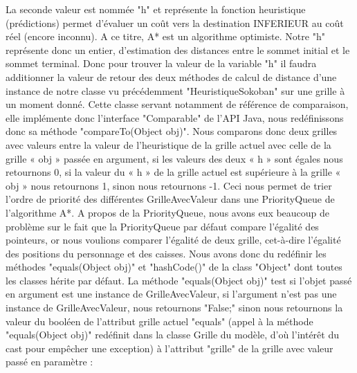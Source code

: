 \documentclass[a4paper,12pt]{article} %
\begin{document}
\newline\newline
La seconde valeur est nommée "h" et représente la fonction heuristique (prédictions) permet d’évaluer un coût vers la destination INFERIEUR au coût réel (encore inconnu).
\newline
A ce titre, A* est un algorithme optimiste.
\newline
Notre "h" représente donc un entier,  d’estimation des distances entre le sommet initial et le sommet terminal.
\newline
Donc pour trouver la valeur de la variable "h" il faudra additionner la valeur de retour des deux méthodes de calcul de distance d’une instance de notre classe vu précédemment "HeuristiqueSokoban" sur une grille à un moment donné. 
\newline\newline
Cette classe servant notamment de référence de comparaison, elle implémente donc l’interface "Comparable" de l’API Java, nous redéfinissons donc sa méthode "compareTo(Object obj)". 
\newline\newline
Nous comparons donc deux grilles avec valeurs entre la valeur de l’heuristique de la grille actuel avec celle de la grille « obj » passée en argument, si les valeurs des deux « h » sont égales nous retournons 0, si la valeur du « h » de la grille actuel est supérieure à la grille « obj » nous retournons 1, sinon nous retournons -1.
\newline\newline
Ceci nous permet de trier l’ordre de priorité des différentes GrilleAvecValeur dans une PriorityQueue de l’algorithme A*.
\newline\newline
A propos de la PriorityQueue, nous avons eux beaucoup de problème sur le fait que la PriorityQueue par défaut compare l’égalité des pointeurs, or nous voulions comparer l’égalité de deux grille, cet-à-dire l’égalité des positions du personnage et des caisses.
\newline\newline
Nous avons donc du redéfinir les méthodes "equals(Object obj)" et "hashCode()" de la class "Object" dont toutes les classes hérite par défaut.
\newline\newline 
La méthode "equals(Object obj)" test si l’objet passé en argument est une instance de GrilleAvecValeur, si l'argument n'est pas une instance de GrilleAvecValeur, nous retournons "False;" sinon nous retournons la valeur du booléen de l’attribut grille actuel "equals" (appel à la méthode "equals(Object obj)" redéfinit dans la classe Grille du modèle, d’où l’intérêt du cast pour empêcher une exception)  à l’attribut "grille" de la grille avec valeur passé en paramètre : 
\end{document}
